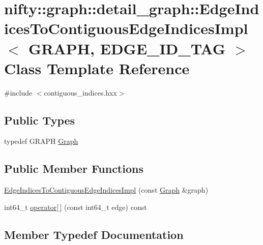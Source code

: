\hypertarget{classnifty_1_1graph_1_1detail__graph_1_1EdgeIndicesToContiguousEdgeIndicesImpl}{}\section{nifty\+:\+:graph\+:\+:detail\+\_\+graph\+:\+:Edge\+Indices\+To\+Contiguous\+Edge\+Indices\+Impl$<$ G\+R\+A\+P\+H, E\+D\+G\+E\+\_\+\+I\+D\+\_\+\+T\+A\+G $>$ Class Template Reference}
\label{classnifty_1_1graph_1_1detail__graph_1_1EdgeIndicesToContiguousEdgeIndicesImpl}


{\ttfamily \#include $<$contiguous\+\_\+indices.\+hxx$>$}

\subsection*{Public Types}
\begin{DoxyCompactItemize}
\item 
typedef G\+R\+A\+P\+H \hyperlink{classnifty_1_1graph_1_1detail__graph_1_1EdgeIndicesToContiguousEdgeIndicesImpl_a0ca0aedc5cca6cdb6ec300f455c30463}{Graph}
\end{DoxyCompactItemize}
\subsection*{Public Member Functions}
\begin{DoxyCompactItemize}
\item 
\hyperlink{classnifty_1_1graph_1_1detail__graph_1_1EdgeIndicesToContiguousEdgeIndicesImpl_a0427ceeeebf1d9c6d0df61a17a60f16e}{Edge\+Indices\+To\+Contiguous\+Edge\+Indices\+Impl} (const \hyperlink{classnifty_1_1graph_1_1detail__graph_1_1EdgeIndicesToContiguousEdgeIndicesImpl_a0ca0aedc5cca6cdb6ec300f455c30463}{Graph} \&graph)
\item 
int64\+\_\+t \hyperlink{classnifty_1_1graph_1_1detail__graph_1_1EdgeIndicesToContiguousEdgeIndicesImpl_a6b61c81dbb699894e396687ae8667e15}{operator\mbox{[}$\,$\mbox{]}} (const int64\+\_\+t edge) const 
\end{DoxyCompactItemize}


\subsection{Member Typedef Documentation}
\hypertarget{classnifty_1_1graph_1_1detail__graph_1_1EdgeIndicesToContiguousEdgeIndicesImpl_a0ca0aedc5cca6cdb6ec300f455c30463}{}
